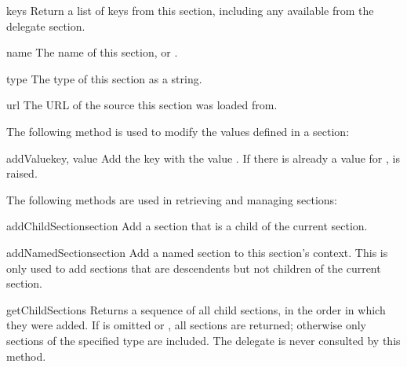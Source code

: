 \documentclass{howto}
\begin{document}
\begin{methoddesc}[Configuration]{keys}{}
  Return a list of keys from this section, including any available
  from the delegate section.
\end{methoddesc}

\begin{memberdesc}[Configuration]{name}
  The name of this section, or .
\end{memberdesc}

\begin{memberdesc}[Configuration]{type}
  The type of this section as a string.
\end{memberdesc}

\begin{memberdesc}[Configuration]{url}
  The URL of the source this section was loaded from.
\end{memberdesc}


The following method is used to modify the values defined in a
section:

\begin{methoddesc}[Configuration]{addValue}{key, value}
  Add the key  with the value .  If there is
  already a value for ,  is
  raised.
\end{methoddesc}


The following methods are used in retrieving and managing sections:

\begin{methoddesc}[Configuration]{addChildSection}{section}
  Add a section that is a child of the current section.
\end{methoddesc}

\begin{methoddesc}[Configuration]{addNamedSection}{section}
  Add a named section to this section's context.  This is only used to
  add sections that are descendents but not children of the current
  section.
\end{methoddesc}

\begin{methoddesc}[Configuration]{getChildSections}{}
  Returns a sequence of all child sections, in the order in which they
  were added.  If  is omitted or , all sections
  are returned; otherwise only sections of the specified type are
  included.  The delegate is never consulted by this method.
\end{methoddesc}
\end{document}

